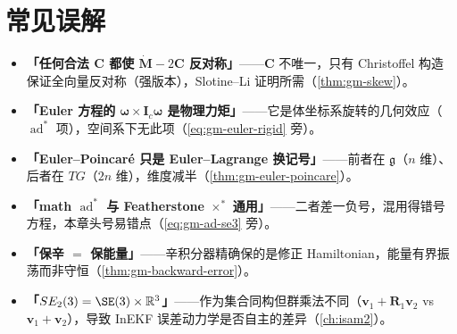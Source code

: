 \section*{常见误解}
\begin{itemize}
  \item \textbf{「任何合法 $\mathbf C$ 都使 $\dot{\mathbf M}-2\mathbf C$ 反对称」}——$\mathbf C$ 不唯一，只有 Christoffel 构造保证全向量反对称（强版本），Slotine--Li 证明所需（\cref{thm:gm-skew}）。
  \item \textbf{「Euler 方程的 $\boldsymbol\omega\times\mathbf I_c\boldsymbol\omega$ 是物理力矩」}——它是体坐标系旋转的几何效应（$\operatorname{ad}^*$ 项），空间系下无此项（\cref{eq:gm-euler-rigid} 旁）。
  \item \textbf{「Euler--Poincaré 只是 Euler--Lagrange 换记号」}——前者在 $\mathfrak g$（$n$ 维）、后者在 $TG$（$2n$ 维），维度减半（\cref{thm:gm-euler-poincare}）。
  \item \textbf{「math $\operatorname{ad}^*$ 与 Featherstone $\times^*$ 通用」}——二者差一负号，混用得错号方程，本章头号易错点（\cref{eq:gm-ad-se3} 旁）。
  \item \textbf{「保辛 $=$ 保能量」}——辛积分器精确保的是修正 Hamiltonian，能量有界振荡而非守恒（\cref{thm:gm-backward-error}）。
  \item \textbf{「$SE_2(3)=\SE(3)\times\mathbb R^3$」}——作为集合同构但群乘法不同（$\mathbf v_1+\mathbf R_1\mathbf v_2$ vs $\mathbf v_1+\mathbf v_2$），导致 InEKF 误差动力学是否自主的差异（\cref{ch:isam2}）。
\end{itemize}

